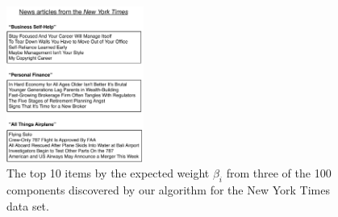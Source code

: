 \begin{figure}
\centering
\includegraphics[width=0.4\textwidth]{./figures/attributes-nyt.pdf}
\caption{The top 10 items by the expected weight $\beta_i$ from three
  of the 100 components discovered by our algorithm for the New York
  Times data set.}
\label{fig:components}
\end{figure}
